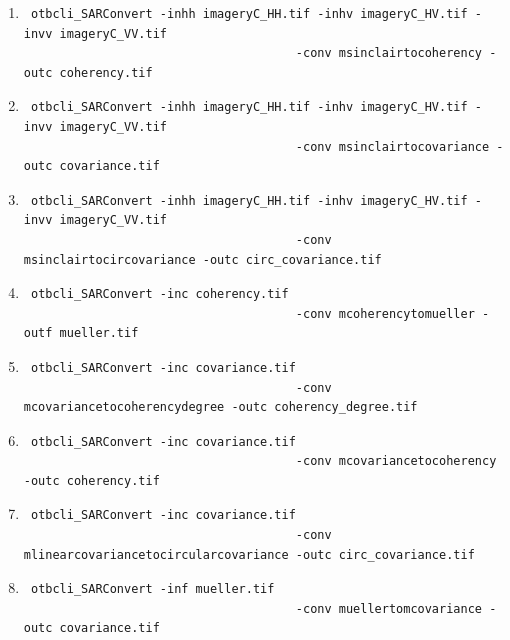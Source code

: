 \begin{enumerate}
\item \begin{verbatim} otbcli_SARConvert -inhh imageryC_HH.tif -inhv imageryC_HV.tif -invv imageryC_VV.tif
									  -conv msinclairtocoherency -outc coherency.tif \end{verbatim}
									  
\item \begin{verbatim} otbcli_SARConvert -inhh imageryC_HH.tif -inhv imageryC_HV.tif -invv imageryC_VV.tif
									  -conv msinclairtocovariance -outc covariance.tif \end{verbatim}
									  
\item \begin{verbatim} otbcli_SARConvert -inhh imageryC_HH.tif -inhv imageryC_HV.tif -invv imageryC_VV.tif
									  -conv msinclairtocircovariance -outc circ_covariance.tif \end{verbatim}
									  
\item \begin{verbatim} otbcli_SARConvert -inc coherency.tif 
									  -conv mcoherencytomueller -outf mueller.tif \end{verbatim}
									  
\item \begin{verbatim} otbcli_SARConvert -inc covariance.tif 
									  -conv mcovariancetocoherencydegree -outc coherency_degree.tif \end{verbatim}
									  
\item \begin{verbatim} otbcli_SARConvert -inc covariance.tif 
									  -conv mcovariancetocoherency -outc coherency.tif \end{verbatim}
									  
\item \begin{verbatim} otbcli_SARConvert -inc covariance.tif 
									  -conv mlinearcovariancetocircularcovariance -outc circ_covariance.tif \end{verbatim}	
									  			
\item \begin{verbatim} otbcli_SARConvert -inf mueller.tif 
									  -conv muellertomcovariance -outc covariance.tif \end{verbatim}	
									  								  

\end{enumerate}
